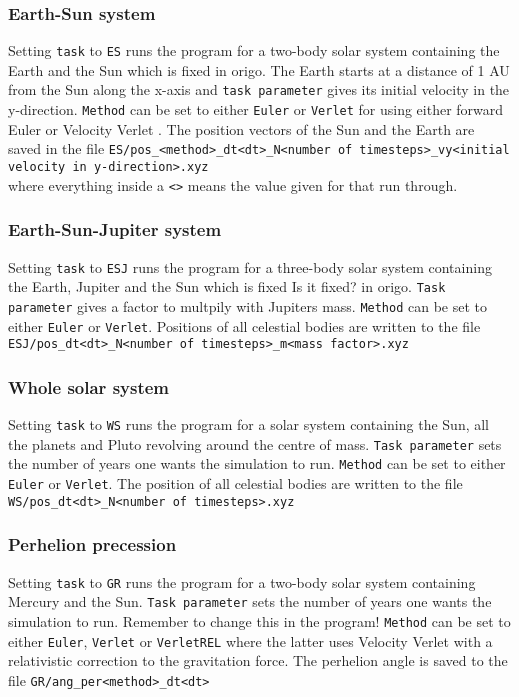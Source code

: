 \documentclass{article}
\newcommand{\husk}[1]{\color{red} #1 \color{black}}
\begin{document}
\subsubsection*{Earth-Sun system}
Setting \texttt{task} to \texttt{ES} runs the program for a two-body solar system containing the Earth and the Sun which is fixed in origo. The Earth starts at a distance of 1 AU from the Sun along  the x-axis and \texttt{task parameter} gives its initial velocity in the y-direction. \texttt{Method} can be set to either \texttt{Euler} or \texttt{Verlet} for using either forward Euler or Velocity Verlet . The position vectors of the Sun and the Earth are saved in the file \texttt{ES/pos\_<method>\_dt<dt>\_N<number of timesteps>\_vy<initial velocity in y-direction>.xyz}\\ where everything inside a \texttt{<>} means the value given for that run through.
\subsubsection*{Earth-Sun-Jupiter system}
Setting \texttt{task} to \texttt{ESJ} runs the program for a three-body solar system containing the Earth, Jupiter and the Sun which is fixed \husk{Is it fixed?} in origo. \texttt{Task parameter} gives a factor to multpily with Jupiters mass. \texttt{Method} can be set to either \texttt{Euler} or \texttt{Verlet}. 
Positions of all celestial bodies are written to the file \\ \texttt{ESJ/pos\_dt<dt>\_N<number of timesteps>\_m<mass factor>.xyz}
\subsubsection*{Whole solar system}
Setting \texttt{task} to \texttt{WS} runs the program for a solar system containing the Sun, all the planets and Pluto revolving around the centre of mass. \texttt{Task parameter} sets the number of years one wants the simulation to run. \texttt{Method} can be set to either \texttt{Euler} or \texttt{Verlet}. The position of all celestial bodies are written to the file \\ 
\texttt{WS/pos\_dt<dt>\_N<number of timesteps>.xyz}
\subsubsection*{Perhelion precession}
Setting \texttt{task} to \texttt{GR} runs the program for a two-body solar system containing Mercury and the Sun. \texttt{Task parameter} sets the number of years one wants the simulation to run. \husk{Remember to change this in the program!} \texttt{Method} can be set to either \texttt{Euler}, \texttt{Verlet} or \texttt{VerletREL} where the latter uses Velocity Verlet with a relativistic correction to the gravitation force. The perhelion angle is saved to the file
\texttt{GR/ang\_per<method>\_dt<dt>}
\end{document}
